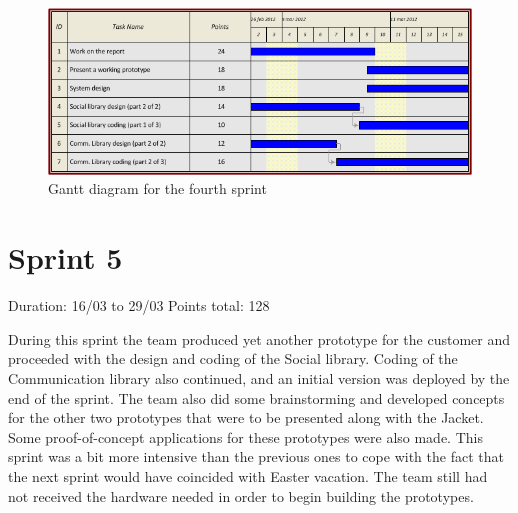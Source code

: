 \begin{figure}[h!]
\centering \includegraphics[scale=0.8]{img/sprints-gantt4.png}
\caption{Gantt diagram for the fourth sprint}
\label{fig:sprints-gantt4}
\end{figure}

\newpage

\section{Sprint 5}

Duration: 16/03 to 29/03\newline
Points total: 128

During this sprint the team produced yet another prototype for the customer
and proceeded with the design and coding of the Social library. Coding of the
Communication library also continued, and an initial version was deployed by the
end of the sprint. The team also did some brainstorming and developed concepts for the other
two prototypes that were to be presented along with the Jacket. Some
proof-of-concept applications for these prototypes were also made. This sprint
was a bit more intensive than the previous ones to cope with the fact that the
next sprint would have coincided with Easter vacation. The team still had not
received the hardware needed in order to begin building the prototypes.

